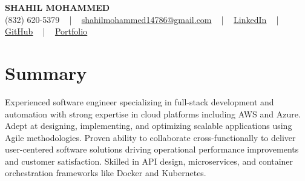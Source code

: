 \documentclass[letterpaper,10pt]{article}
\begin{document}
\begin{center}
    {\fontsize{14pt}{12pt}\selectfont \textbf{\MakeUppercase{Shahil Mohammed}}}\\ \vspace{2pt}
    \fontsize{10pt}{12pt}\selectfont (832) 620-5379 ~ | ~ \href{mailto:shahilmohammed14786@gmail.com}{shahilmohammed14786@gmail.com} ~ | ~  
    \href{https://www.linkedin.com/in/shahil-mohammed-9652931a1/}{\color{blue}\underline{LinkedIn}}  ~ | ~ 
    \href{https://github.com/freakbeast14}{\color{blue}\underline{GitHub}} ~ | ~ 
    \href{https://shahil-mohammed.netlify.app/}{\color{blue}\underline{Portfolio}}
    \vspace{-8pt}
\end{center}

\section{Summary}
\vspace{-2pt}\fontsize{8pt}{9pt}\selectfont
Experienced software engineer specializing in full-stack development and automation with strong expertise in cloud platforms including AWS and Azure. Adept at designing, implementing, and optimizing scalable applications using Agile methodologies. Proven ability to collaborate cross-functionally to deliver user-centered software solutions driving operational performance improvements and customer satisfaction. Skilled in API design, microservices, and container orchestration frameworks like Docker and Kubernetes.
 \vspace{-5pt}
 
\vspace{-2pt}
\end{document}
